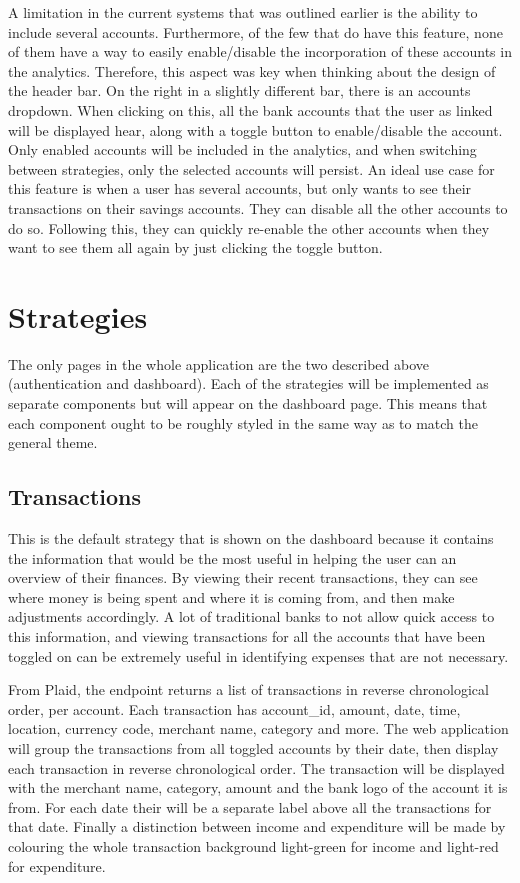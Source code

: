 A limitation in the current systems that was outlined earlier is the ability to include several accounts. Furthermore, of the few that do have this feature, none of them have a way to easily enable/disable the incorporation of these accounts in the analytics. Therefore, this aspect was key when thinking about the design of the header bar. On the right in a slightly different bar, there is an accounts dropdown. When clicking on this, all the bank accounts that the user as linked will be displayed hear, along with a toggle button to enable/disable the account. Only enabled accounts will be included in the analytics, and when switching between strategies, only the selected accounts will persist. An ideal use case for this feature is when a user has several accounts, but only wants to see their transactions on their savings accounts. They can disable all the other accounts to do so. Following this, they can quickly re-enable the other accounts when they want to see them all again by just clicking the toggle button.

\section{Strategies}
The only pages in the whole application are the two described above (authentication and dashboard). Each of the strategies will be implemented as separate components but will appear on the dashboard page. This means that each component ought to be roughly styled in the same way as to match the general theme.

\subsection{Transactions}
This is the default strategy that is shown on the dashboard because it contains the information that would be the most useful in helping the user can an overview of their finances. By viewing their recent transactions, they can see where money is being spent and where it is coming from, and then make adjustments accordingly. A lot of traditional banks to not allow quick access to this information, and viewing transactions for all the accounts that have been toggled on can be extremely useful in identifying expenses that are not necessary.

From Plaid, the endpoint returns a list of transactions in reverse chronological order, per account. Each transaction has account\_id, amount, date, time, location, currency code, merchant name, category and more. The web application will group the transactions from all toggled accounts by their date, then display each transaction in reverse chronological order. The transaction will be displayed with the merchant name, category, amount and the bank logo of the account it is from. For each date their will be a separate label above all the transactions for that date. Finally a distinction between income and expenditure will be made by colouring the whole transaction background light-green for income and light-red for expenditure.


